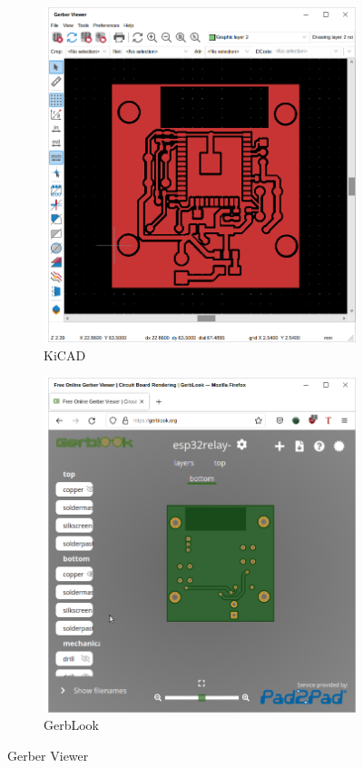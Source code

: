 \documentclass[12pt]{book}
\begin{document}
	\begin{figure}[!ht]
		\centering
		\begin{subfigure}[t]{0.4\textwidth}
			\includegraphics[width=\textwidth]{images/fab/fab_2}
			\caption{KiCAD}
		\end{subfigure}
		\begin{subfigure}[t]{0.4\textwidth}
			\includegraphics[width=\textwidth]{images/fab/fab_3}
			\caption{GerbLook}
		\end{subfigure}
		\caption{Gerber Viewer}
	\end{figure}
\end{document}
